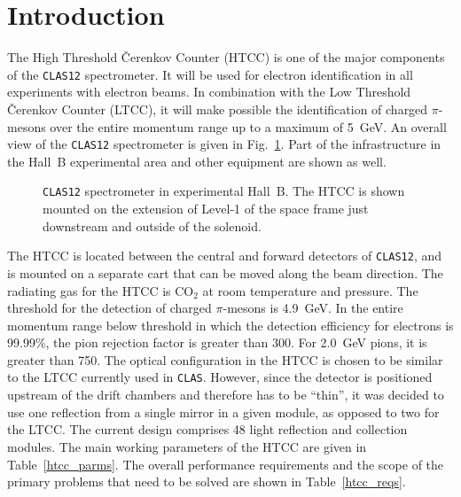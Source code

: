 \section{Introduction}
\label{Introduction}

The High Threshold {\v C}erenkov Counter (HTCC) is one of the major 
components of the {\tt CLAS12} spectrometer.  It will be used for 
electron identification in all experiments with electron beams.  In 
combination with the Low Threshold {\v C}erenkov Counter (LTCC), it 
will make possible the identification of charged $\pi$-mesons over 
the entire momentum range up to a maximum of 5~GeV.  An overall view 
of the {\tt CLAS12} spectrometer is given in Fig.~\ref{CLAS12}.  Part 
of the infrastructure in the Hall~B experimental area and other 
equipment are shown as well.

\begin{figure}
\begin{center}
\caption{\small{{\tt CLAS12} spectrometer in experimental Hall~B. The
HTCC is shown mounted on the extension of Level-1 of the space frame
just downstream and outside of the solenoid.}}
\label{CLAS12}
\end{center}
\end{figure}
   
The HTCC is located between the central and forward detectors of 
{\tt CLAS12}, and is mounted on a separate cart that can be moved along the 
beam direction.  The radiating gas for the HTCC is CO$_2$ at room 
temperature and pressure.  The threshold for the detection of charged 
$\pi$-mesons is 4.9~GeV.  In the entire momentum range below threshold in 
which the detection efficiency for electrons is 99.99\%, the pion rejection 
factor is greater than 300.  For 2.0~GeV pions, it is greater than 750. The 
optical configuration in the HTCC is chosen to be similar to the LTCC 
currently used in {\tt CLAS}.  However, since the detector is positioned 
upstream of the drift chambers and therefore has to be ``thin'', it was 
decided to use one reflection from a single mirror in a given module, as 
opposed to two for the LTCC.  The current design comprises 48 light 
reflection and collection modules.  The main working parameters of the 
HTCC are given in Table~\ref{htcc_parms}.  The overall performance 
requirements and the scope of the primary problems that need to be solved 
are shown in Table~\ref{htcc_reqs}.

